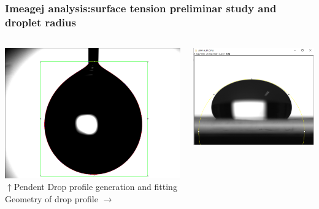 \documentclass[xcolor=table]{beamer}
\begin{document}
\begin{frame}

\frametitle{Imeagej analysis:surface tension preliminar study and droplet radius}
\fontsize{10}{10.2} \selectfont

\begin{columns}
\begin{column}{.5\textwidth}
\includegraphics[width=0.95\columnwidth]{analpendandt.PNG}\\
$\uparrow$Pendent Drop profile generation and fitting\\
\medskip
Geometry of drop profile $\rightarrow$
\end{column}
\begin{column}{.5\textwidth}
\includegraphics[width=0.8\columnwidth]{200muL.PNG}\\

\end{column}
\end{columns}
\end{frame}
\end{document}
